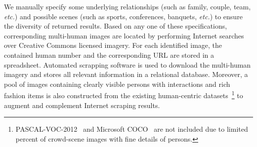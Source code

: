 \documentclass[10pt,twocolumn,letterpaper]{article}
\theoremstyle{definition}
\theoremstyle{remark}
\begin{document}
We manually specify some underlying relationships (such as family, couple, team, \emph{etc.}) and  possible scenes (such as sports, conferences, banquets, \emph{etc.}) to ensure the diversity of returned results. Based on any one of these specifications, corresponding multi-human images are located by performing Internet searches over Creative Commons licensed imagery. For each identified image, the contained human number and the corresponding URL are stored in a spreadsheet. Automated scrapping software is used to download the multi-human imagery and stores all relevant information in a relational database. Moreover, a pool of images containing clearly visible persons with interactions and rich fashion items is also constructed from the existing human-centric datasets~\cite{zhang2015beyond, chu2015multi, zhang2016facial, sapp2013modec, klare2015pushing}\footnote{PASCAL-VOC-2012~\cite{everingham2015pascal} and Microsoft COCO~\cite{lin2014microsoft} are not included due to limited percent of crowd-scene images with fine details of persons.} to augment and complement Internet scraping results.
\end{document}
